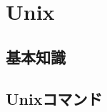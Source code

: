 \documentclass[main]{subfiles}
\begin{document}
\chapter{Unix}
\section{基本知識}
\section{Unixコマンド}
\end{document}

